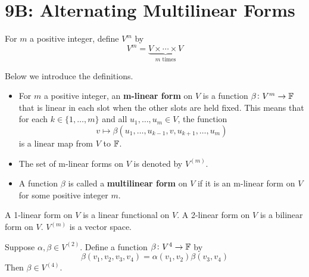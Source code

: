 \documentclass{extarticle}
\begin{document}


\newpage 
\section*{9B: Alternating Multilinear Forms}


\begin{definition}[\(V^m\)]
    For \(m\) a positive integer, define \(V^m\) by 
    \[V^m = \underbrace{V \times \cdots \times V}_{m \text{ times}}\]
\end{definition}

\begin{definition}
    Below we introduce the definitions.
    \begin{itemize}
        \item For \(m\) a positive integer, an \textbf{m-linear form} on \(V\) is a function 
        \(\beta \colon V^m \to \mathbb{F}\) that is linear in each slot when the other slots are held fixed. This means 
        that for each \(k \in \{1, \ldots, m\}\) and all \(u_1, \ldots, u_m \in V\), the function 
        \[v \mapsto \beta(u_1, \ldots, u_{k-1}, v, u_{k+1}, \ldots, u_m)\]
        is a linear map from \(V\) to \(\mathbb{F}\).
        
        \item The set of m-linear forms on \(V\) is denoted by \(V^{(m)}\). 
        \item A function \(\beta\) is called a \textbf{multilinear form} on \(V\) if it is an m-linear form on 
        \(V\) for some positive integer \(m\).
    \end{itemize}
\end{definition}

\begin{remark}
    A 1-linear form on \(V\) is a linear functional on \(V\). A 2-linear form on \(V\) is a bilinear form 
    on \(V\). \(V^{(m)}\) is a vector space. 
\end{remark}

\begin{example}
    Suppose \(\alpha, \beta \in V^{(2)}\). Define a function \(\beta \colon V^4 \to \mathbb{F}\) by 
    \[\beta(v_1, v_2, v_3, v_4) = \alpha(v_1, v_2) \beta(v_3, v_4)\] 
    Then \(\beta \in V^{(4)}\).
\end{example}
\end{document}
